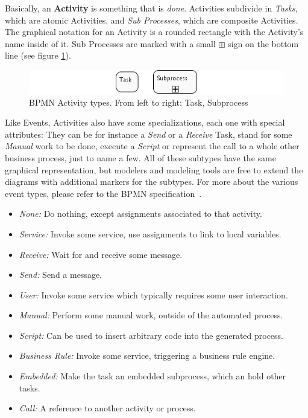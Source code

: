 Basically, an \textbf{Activity} is something that is \emph{done}.  Activities
subdivide in \emph{Tasks}, which are atomic Activities, and \emph{Sub Processes},
which are composite Activities.  The graphical notation for an Activity is a
rounded rectangle with the Activity's name inside of it.  Sub Processes are marked
with a small $ \boxplus $ sign on the bottom line (see figure \ref{fig:activities}).

\begin{figure}[ht]
	\centering
	\includegraphics[width=.75\textwidth]{figures/bpmn/activities.png}
	\caption[BPMN Activity types]{BPMN Activity types.  From left to right: Task,
	Subprocess}
	\label{fig:activities}
\end{figure}

Like Events, Activities also have some specializations, each one with special
attributes: They can be for instance a \emph{Send} or a \emph{Receive} Task, stand
for some \emph{Manual} work to be done, execute a \emph{Script} or represent the
call to a whole other business process, just to name a few.  All of these subtypes
have the same graphical representation, but modelers and modeling tools are free
to extend the diagrams with additional markers for the subtypes.  For more about
the various event types, please refer to the BPMN specification~\cite{omg2009bpmn}.

\begin{itemize}
	\item \emph{None:} Do nothing, except assignments associated to that activity.
	\item \emph{Service:} Invoke some service, use assignments to link to local variables.
	\item \emph{Receive:} Wait for and receive some message.
	\item \emph{Send:} Send a message.
	\item \emph{User:} Invoke some service which typically requires some user interaction.
	\item \emph{Manual:} Perform some manual work, outside of the automated process.
	\item \emph{Script:} Can be used to insert arbitrary code into the generated process.
	\item \emph{Business Rule:} Invoke some service, triggering a business rule engine.
	\item \emph{Embedded:} Make the task an embedded subprocess, which an hold other tasks.
	\item \emph{Call:} A reference to another activity or process.
\end{itemize}


